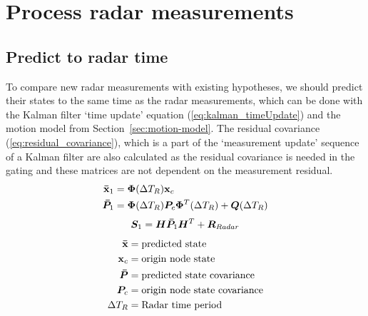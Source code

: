 \section{Process radar measurements}\label{sec:process_radar_measurements}
\subsection{Predict to radar time}
To compare new radar measurements with existing hypotheses, we should predict their states to the same time as the radar measurements, which can be done with the Kalman filter `time update' equation (\ref{eq:kalman_timeUpdate}) and the motion model from Section~\ref{sec:motion-model}. The residual covariance (\ref{eq:residual_covariance}), which is a part of the `measurement update' sequence of a Kalman filter are also calculated as the residual covariance is needed in the gating and these matrices are not dependent on the measurement residual.
\begin{equation}\label{eq:kalman_timeUpdate}
\begin{split}
\boldsymbol{\mathbf{\bar{x}}}_1 	&= \bm{\Phi}(\Delta T_R) \boldsymbol{\mathbf{x}}_c \\
\bm{\bar{P}}_1	&= \bm{\Phi}(\Delta T_R) \bm{P}_c \bm{\Phi}^T(\Delta T_R) + \bm{Q}(\Delta T_R) \\
\end{split}
\end{equation}
\begin{equation}\label{eq:residual_covariance}
\bm{S}_1	= \bm{H}\bm{\bar{P}}_1 \bm{H}^T + \bm{R}_{Radar}
\end{equation}
\begin{equation*}
\begin{split}
\boldsymbol{\mathbf{\bar{x}}}		&= \text{predicted state} \\
\boldsymbol{\mathbf{x}}_c 		&= \text{origin node state} \\
\bm{\bar{P}} 	&= \text{predicted state covariance} \\
\bm{P}_c 		&= \text{origin node state covariance} \\
\Delta T_R 		&= \text{Radar time period} \\
\end{split}
\end{equation*}

